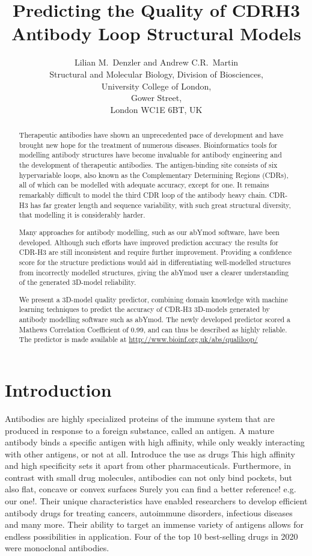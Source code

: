 \documentclass[12pt]{article}
\title{Predicting the Quality of CDRH3 Antibody Loop Structural Models}
\author{Lilian M.\ Denzler and Andrew C.R.\ Martin\\
Structural and Molecular Biology, Division of Biosciences,\\
University College of London,\\
Gower Street,\\
London WC1E 6BT, UK
}
\newcommand{\lilian}[1]{ {\color{red}{\bfseries Lilian:} #1}}
\begin{document}
\maketitle

\begin{abstract}
  Therapeutic antibodies have shown an unprecedented pace of
  development and have brought new hope for the treatment of numerous
  diseases. Bioinformatics tools for modelling antibody structures
  have become invaluable for antibody engineering and the development
  of therapeutic antibodies. The antigen-binding site consists of six
  hypervariable loops, also known as the Complementary Determining
  Regions (CDRs), all of which can be modelled with adequate accuracy,
  except for one. It remains remarkably difficult to model the third CDR
  loop of the antibody heavy chain. CDR-H3 has
  far greater length and sequence variability, with such great structural
  diversity, that modelling it is considerably harder.

  Many approaches for antibody modelling, such as our
  abYmod software, have been developed. Although such efforts have
  improved prediction accuracy the results for CDR-H3 are
  still inconsistent and require further improvement. Providing a
  confidence score for the structure predictions would aid in
  differentiating well-modelled structures from incorrectly modelled
  structures, giving the abYmod user a clearer understanding of the
  generated 3D-model reliability.

  We present a 3D-model quality predictor, combining domain knowledge
  with machine learning techniques to predict the accuracy of CDR-H3
  3D-models generated by antibody modelling software such as abYmod. The
  newly developed predictor scored a Mathews Correlation Coefficient
  of 0.99, and can thus be described as highly reliable. The predictor
  is made available at \url{http://www.bioinf.org.uk/abs/qualiloop/}
\end{abstract}

\section{Introduction}

Antibodies are highly specialized proteins of the immune system that
are produced in response to a foreign substance, called an antigen. A
mature antibody binds a specific antigen with high affinity, while
only weakly interacting with other antigens, or not at all. \lilian{Introduce the use as drugs} This high
affinity and high specificity sets it apart from other pharmaceuticals.
Furthermore, in contrast with small drug molecules, antibodies can not
only bind pockets, but also flat, concave or convex
surfaces\cite{Tavers2001}\lilian{Surely you can find a better reference! e.g. our one!}. Their unique characteristics have enabled 
researchers to develop efficient antibody drugs for treating cancers,
autoimmune disorders, infectious diseases and many more\cite{Lu2020}.
Their ability to target an immense variety of antigens allows for
endless possibilities in application. 
Four of the top 10 best-selling drugs in
2020 were monoclonal antibodies\cite{Urquhart2021}.
\end{document}
